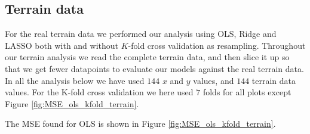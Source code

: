 \documentclass[norsk,a4paper,12pt]{article}
\begin{document}
\begin{multicols}{2}


\subsection{Terrain data}
For the real terrain data we performed our analysis using OLS, Ridge and LASSO both with and without $K$-fold cross validation as resampling. Throughout our terrain analysis we read the complete terrain data, and then slice it up so that we get fewer datapoints to evaluate our models against the real terrain data. In all the analysis below we have used $144$ $x$ and $y$ values, and $144$ terrain data values. For the K-fold cross validation we here used $7$ folds for all plots except Figure \ref{fig:MSE_ols_kfold_terrain}.

The MSE found for OLS is shown in Figure \ref{fig:MSE_ols_kfold_terrain}. 


\end{multicols}
\end{document}
